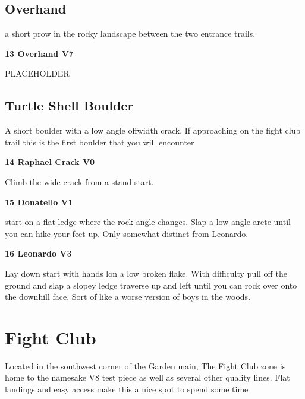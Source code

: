 \begin{multicols}{2}
			\subsection*{Overhand}\label{bf:Overhand}
			a short prow in the rocky landscape between the two entrance trails.
			

					\label{rt:Overhand} \colorbox{Goldenrod!50}{\textbf{13 Overhand V7  }}
					\begin{adjustwidth}{1cm}{}
					PLACEHOLDER
					\end{adjustwidth}
			\subsection*{Turtle Shell Boulder}\label{bf:Turtle Shell Boulder}
			A short boulder with a low angle offwidth crack. If approaching on the fight club trail this is the first boulder that you will encounter
			

					\label{rt:Raphael Crack} \colorbox{green!20}{\textbf{14 Raphael Crack V0   }}
					\begin{adjustwidth}{1cm}{}
					Climb the wide crack from a stand start.
					\end{adjustwidth}
					\label{rt:Donatello} \colorbox{green!20}{\textbf{15 Donatello V1   }}
					\begin{adjustwidth}{1cm}{}
					start on a flat ledge where the rock angle changes. Slap a low angle arete until you can hike your feet up. Only somewhat distinct from Leonardo.
					\end{adjustwidth}
					\label{rt:Leonardo} \colorbox{green!20}{\textbf{16 Leonardo V3   }}
					\begin{adjustwidth}{1cm}{}
					Lay down start with hands lon a low broken flake. With difficulty pull off the ground and slap a slopey ledge traverse up and left until you can rock over onto the downhill face. Sort of like a worse version of boys in the woods.
					\end{adjustwidth}
		\section{Fight Club}\label{sa:Fight Club}
	Located in the southwest corner of the Garden main, The Fight Club zone is home to the namesake V8 test piece as well as several other quality lines. Flat landings and easy access make this a nice spot to spend some time


\end{multicols}
